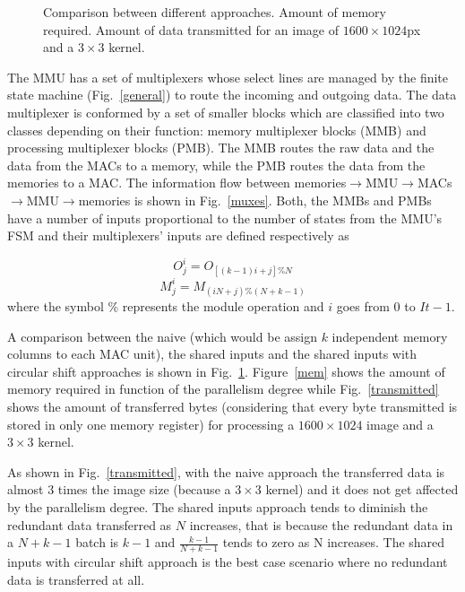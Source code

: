 \documentclass[conference,compsoc]{IEEEtran}
\begin{document}
\begin{figure}[!t]
{\label{transmitted}}
\caption{Comparison between different approaches. \protect{} Amount of
  memory required. \protect{} Amount of data transmitted for an image of $1600\times1024$px and a $3\times3$ kernel.}
\label{comp}
\end{figure}

The MMU has a set of multiplexers whose select lines are managed by the finite
state machine (Fig.~\ref{general}) to route the incoming and outgoing data. The
data multiplexer is conformed by a set of smaller blocks which are classified
into two classes depending on their function: memory multiplexer blocks (MMB)
and processing multiplexer blocks (PMB). The MMB routes the raw data and the
data from the MACs to a memory, while the PMB routes the data from the memories
to a MAC. The information flow between
memories$\rightarrow$MMU$\rightarrow$MACs$\rightarrow$MMU$\rightarrow$memories
is shown in Fig.~\ref{muxes}. Both, the MMBs and PMBs have a number of inputs
proportional to the number of states from the MMU's FSM and their multiplexers'
inputs are defined respectively as

\begin{equation}%
  O_j^i = O_{[(k-1)i+j]\%N}
\end{equation}
\begin{equation}%
  M_j^i = M_{(iN+j)\%(N+k-1)}
\end{equation}
where the symbol $\%$ represents the module operation and $i$ goes from $0$ to $It-1$.

A comparison between the naive (which would be assign $k$ independent
memory columns to each MAC unit), the shared inputs and the
shared inputs with circular shift approaches is shown in Fig.~\ref{comp}.
Figure~\ref{mem} shows the amount of memory required in function of the
parallelism degree while Fig.~\ref{transmitted} shows the amount of transferred
bytes (considering that every byte transmitted is stored in only one memory
register) for processing a $1600\times1024$ image and a $3\times3$ kernel.

As shown in Fig.~\ref{transmitted}, with the naive approach the transferred data is
almost $3$ times the image size (because a $3\times3$ kernel) and it does not
get affected by the parallelism degree. The shared inputs approach tends to
diminish the redundant data transferred as $N$ increases, that is because the
redundant data in a $N+k-1$ batch is $k-1$ and $\frac{k-1}{N+k-1}$ tends to zero
as N increases. The shared inputs with circular shift approach is the best case
scenario where no redundant data is transferred at all.
\end{document}
